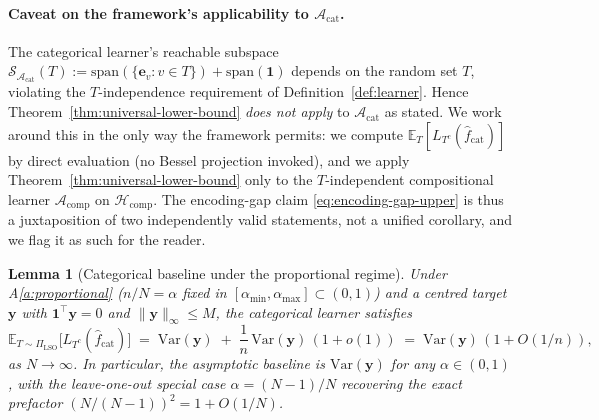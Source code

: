 \documentclass[11pt,a4paper]{article}
\theoremstyle{plain}
\newtheorem{lemma}[theorem]{Lemma}
\theoremstyle{definition}
\theoremstyle{remark}
\newcommand{\by}{\mathbf{y}}
\newcommand{\bone}{\mathbf{1}}
\newcommand{\E}{\mathbb{E}}
\newcommand{\Var}{\mathrm{Var}}
\newcommand{\Scal}{\mathcal{S}}
\newcommand{\Acal}{\mathcal{A}}
\newcommand{\Hcal}{\mathcal{H}}
\begin{document}
\paragraph{Caveat on the framework's applicability to $\Acal_{\mathrm{cat}}$.}
The categorical learner's reachable subspace
$\Scal_{\Acal_{\mathrm{cat}}}(T) := \mathrm{span}(\{\mathbf{e}_v : v \in T\})
+ \mathrm{span}(\bone)$ depends on the random set $T$, violating
the $T$-independence requirement of Definition~\ref{def:learner}.
Hence Theorem~\ref{thm:universal-lower-bound} \emph{does not apply}
to $\Acal_{\mathrm{cat}}$ as stated. We work around this in the
only way the framework permits: we compute
$\E_T[L_{T^c}(\hat f_{\mathrm{cat}})]$ by direct evaluation (no
Bessel projection invoked), and we apply
Theorem~\ref{thm:universal-lower-bound} only to the
$T$-independent compositional learner $\Acal_{\mathrm{comp}}$
on $\Hcal_{\mathrm{comp}}$. The encoding-gap claim
\eqref{eq:encoding-gap-upper} is thus a juxtaposition of two
independently valid statements, not a unified corollary, and we
flag it as such for the reader.

\begin{lemma}[Categorical baseline under the proportional regime]
\label{lem:cat-baseline}
Under A\ref{a:proportional} ($n/N = \alpha$ fixed in $[\alpha_{\min},
\alpha_{\max}] \subset (0, 1)$) and a centred target $\by$ with
$\bone^\top \by = 0$ and $\|\by\|_\infty \le M$, the categorical
learner satisfies
\begin{equation}
    \E_{T \sim \Pi_{\mathrm{LSO}}}\!\big[L_{T^c}(\hat f_{\mathrm{cat}})\big]
    \;=\; \Var(\by)\;+\;\frac{1}{n}\,\Var(\by)\,(1 + o(1))
    \;=\; \Var(\by)\,(1 + O(1/n)),
    \label{eq:cat-baseline}
\end{equation}
as $N \to \infty$. In particular, the asymptotic baseline is
$\Var(\by)$ for any $\alpha \in (0,1)$, with the leave-one-out
special case $\alpha = (N-1)/N$ recovering the exact prefactor
$(N/(N-1))^2 = 1 + O(1/N)$.
\end{lemma}
\end{document}
